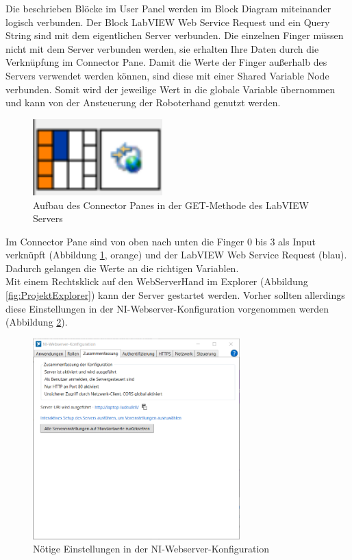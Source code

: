 \documentclass[a4paper,12pt,final]{article} %
\numberwithin{equation}{section} %
\numberwithin{figure}{section} %
\numberwithin{table}{section} %
\begin{document}
Die beschrieben Blöcke im User Panel werden im Block Diagram miteinander logisch verbunden.
Der Block LabVIEW Web Service Request und ein Query String sind mit dem eigentlichen Server verbunden. Die einzelnen Finger müssen nicht mit dem Server verbunden werden, sie erhalten Ihre Daten durch die Verknüpfung im Connector Pane.
Damit die Werte der Finger außerhalb des Servers verwendet werden können, sind diese mit einer Shared Variable Node verbunden. Somit wird der jeweilige Wert in die globale Variable übernommen und kann von der Ansteuerung der Roboterhand genutzt werden.  
\begin{figure}[H]
	\begin{center}
		\includegraphics[width=5cm]{Bilder/ConnectorPane.png}
		\caption{Aufbau des Connector Panes in der GET-Methode des LabVIEW Servers}
		\label{fig:LabVIEWConnectorPane}
	\end{center}
\end{figure}  
Im Connector Pane sind von oben nach unten die Finger 0 bis 3 als Input verknüpft (Abbildung \ref{fig:LabVIEWConnectorPane}, orange) und der LabVIEW Web Service Request (blau). 
Dadurch gelangen die Werte an die richtigen Variablen.\\
Mit einem Rechtsklick auf den WebServerHand im Explorer (Abbildung \ref{fig:ProjektExplorer}) kann der Server gestartet werden. Vorher sollten allerdings diese Einstellungen in der NI-Webserver-Konfiguration vorgenommen werden (Abbildung \ref{fig:EinstellungenWebServer}).
\begin{figure}[H]
	\begin{center}
		\includegraphics[width=8cm]{Bilder/Einstellungen-StartServerNeu.png}
		\caption{Nötige Einstellungen in der NI-Webserver-Konfiguration}
		\label{fig:EinstellungenWebServer}
	\end{center}
\end{figure}
\end{document}
